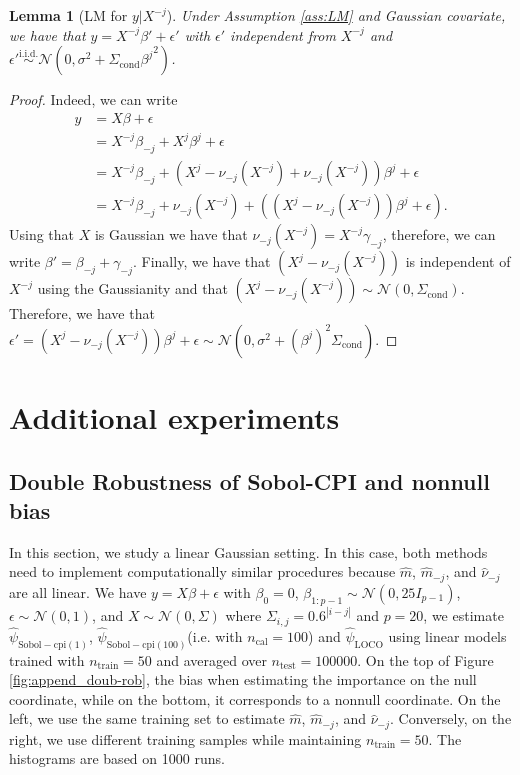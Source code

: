 \documentclass{article}
\theoremstyle{plain}
\newtheorem{lemma}[theorem]{Lemma}
\theoremstyle{definition}
\theoremstyle{remark}
\begin{document}
\begin{lemma}[LM for $y|X^{-j}$]
Under Assumption \ref{ass:LM} and Gaussian covariate, we have that $y=X^{-j}\beta'+\epsilon'$ with $\epsilon'$ independent from $X^{-j}$ and $\epsilon'\overset{\mathrm{i.i.d.}}{\sim}\mathcal{N}(0, \sigma^2+\Sigma_{\mathrm{cond}}{\beta^j}^2)$.\label{lemma:LMX_without_j}
\end{lemma}
\begin{proof}
Indeed, we can write 
    \begin{align*}
        y&=X\beta+\epsilon\\
        &= X^{-j}\beta_{-j}+X^j\beta^j+\epsilon\\
        &=  X^{-j}\beta_{-j}+(X^j-\nu_{-j}(X^{-j})+\nu_{-j}(X^{-j}))\beta^j+\epsilon\\
        &= X^{-j}\beta_{-j}+\nu_{-j}(X^{-j})+\left((X^j-\nu_{-j}(X^{-j}))\beta^j+\epsilon\right).
    \end{align*}
    Using that $X$ is Gaussian we have that $\nu_{-j}(X^{-j})=X^{-j}\gamma_{-j}$, therefore, we can write $\beta'=\beta_{-j}+\gamma_{-j}$. Finally, we have that $(X^j-\nu_{-j}(X^{-j}))$ is independent of $X^{-j}$ using the Gaussianity and that $(X^j-\nu_{-j}(X^{-j}))\sim \mathcal{N}(0, \Sigma_\mathrm{cond})$. Therefore, we have that $\epsilon'=(X^j-\nu_{-j}(X^{-j}))\beta^j+\epsilon\sim \mathcal{N}(0, \sigma^2+ (\beta^j)^2\Sigma_\mathrm{cond})$.
\end{proof}


\section{Additional experiments}


\subsection{Double Robustness of Sobol-CPI and nonnull bias}

In this section, we study a linear Gaussian setting. In this case, both methods need to implement computationally similar procedures because $\widehat{m}$, $\widehat{m}_{-j}$, and $\widehat{\nu}_{-j}$ are all linear. We have $y = X\beta + \epsilon$ with $\beta_0 = 0$, $\beta_{1:p-1} \sim \mathcal{N}(0, 25I_{p-1})$, $\epsilon \sim \mathcal{N}(0, 1)$, and $X \sim \mathcal{N}(0, \Sigma)$ where $\Sigma_{i,j} = 0.6^{|i-j|}$ and $p = 20$, we estimate $\widehat{\psi}_\mathrm{Sobol-cpi(1)}$, $\widehat{\psi}_\mathrm{Sobol-cpi(100)}$(i.e. with $n_\mathrm{cal}=100$) and $\widehat{\psi}_\mathrm{LOCO}$ using linear models trained with $n_\mathrm{train} = 50$ and averaged over $n_\mathrm{test} = 100000$.
On the top of Figure \ref{fig:append_doub-rob}, the bias when estimating the importance on the null coordinate, while on the bottom, it corresponds to a nonnull coordinate. On the left, we use the same training set to estimate $\widehat{m}$, $\widehat{m}_{-j}$, and $\widehat{\nu}_{-j}$. Conversely, on the right, we use different training samples while maintaining $n_\mathrm{train} = 50$. The histograms are based on 1000 runs.
\end{document}
